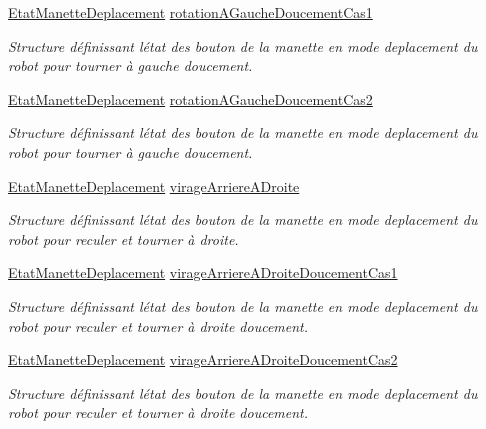 \begin{DoxyCompactItemize}
\hyperlink{struct_etat_manette_deplacement}{Etat\+Manette\+Deplacement} \hyperlink{class_manette_ac24e87d64418d5667a378b2f508a0759}{rotation\+A\+Gauche\+Doucement\+Cas1}
\begin{DoxyCompactList}\small\item\em Structure définissant l\textquotesingle{}état des bouton de la manette en mode deplacement du robot pour tourner à gauche doucement. \end{DoxyCompactList}\item 
\hyperlink{struct_etat_manette_deplacement}{Etat\+Manette\+Deplacement} \hyperlink{class_manette_a21fa44eaadd677f97cdc876da8fe3143}{rotation\+A\+Gauche\+Doucement\+Cas2}
\begin{DoxyCompactList}\small\item\em Structure définissant l\textquotesingle{}état des bouton de la manette en mode deplacement du robot pour tourner à gauche doucement. \end{DoxyCompactList}\item 
\hyperlink{struct_etat_manette_deplacement}{Etat\+Manette\+Deplacement} \hyperlink{class_manette_a6df334aec9f621e7394e9f398221fe9e}{virage\+Arriere\+A\+Droite}
\begin{DoxyCompactList}\small\item\em Structure définissant l\textquotesingle{}état des bouton de la manette en mode deplacement du robot pour reculer et tourner à droite. \end{DoxyCompactList}\item 
\hyperlink{struct_etat_manette_deplacement}{Etat\+Manette\+Deplacement} \hyperlink{class_manette_a2dddb8a8a6f75abc15ddf58025b98ecc}{virage\+Arriere\+A\+Droite\+Doucement\+Cas1}
\begin{DoxyCompactList}\small\item\em Structure définissant l\textquotesingle{}état des bouton de la manette en mode deplacement du robot pour reculer et tourner à droite doucement. \end{DoxyCompactList}\item 
\hyperlink{struct_etat_manette_deplacement}{Etat\+Manette\+Deplacement} \hyperlink{class_manette_a609f10f48e39eafac800eb232272f0cb}{virage\+Arriere\+A\+Droite\+Doucement\+Cas2}
\begin{DoxyCompactList}\small\item\em Structure définissant l\textquotesingle{}état des bouton de la manette en mode deplacement du robot pour reculer et tourner à droite doucement. \end{DoxyCompactList}\item 

\end{DoxyCompactItemize}
